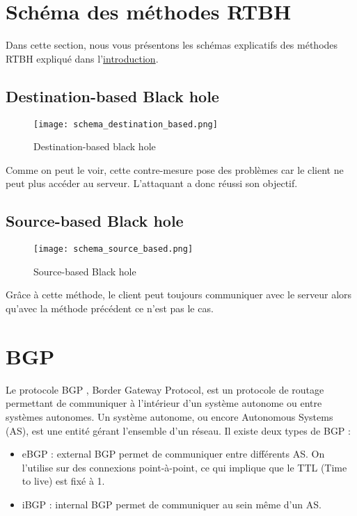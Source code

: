 \section{Schéma des méthodes RTBH}

Dans cette section, nous vous présentons les schémas explicatifs des méthodes RTBH expliqué dans l'\hyperref[sec:intro]{introduction}.

\newpage

\subsection{Destination-based Black hole}

\begin{figure}[H]
    \texttt{[image: schema\_destination\_based.png]}
    \caption{Destination-based black hole}
    \label{fig:destination_based}
\end{figure}

Comme on peut le voir, cette contre-mesure pose des problèmes car le client ne peut plus accéder au serveur. L'attaquant a donc réussi son objectif.

\subsection{Source-based Black hole}

\begin{figure}[H]
    \texttt{[image: schema\_source\_based.png]}
    \caption{Source-based Black hole}
    \label{fig:source_based}
\end{figure}

Grâce à cette méthode, le client peut toujours communiquer avec le serveur alors qu'avec la méthode précédent ce n'est pas le cas.

\section{BGP}
\label{sec:BGP}

Le protocole BGP \cite{Rfcbgp06}, Border Gateway Protocol, est un protocole de routage permettant de communiquer à l'intérieur d'un système autonome ou entre systèmes autonomes. Un système autonome, ou encore Autonomous Systems (AS), est une entité gérant l'ensemble d'un réseau. Il existe deux types de BGP :

\begin{itemize}
    \item eBGP : external BGP permet de communiquer entre différents AS. On l'utilise sur des connexions point-à-point, ce qui implique que le TTL (Time to live) est fixé à 1.
    \item iBGP : internal BGP permet de communiquer au sein même d'un AS. 
\end{itemize}

